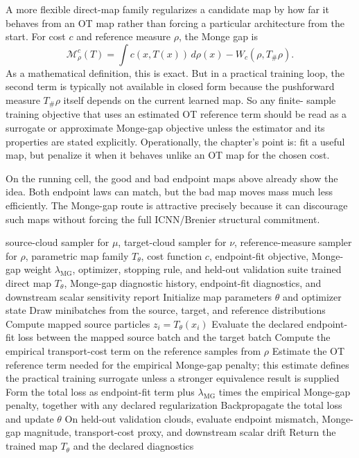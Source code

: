 A more flexible direct-map family regularizes a candidate map by how far it
behaves from an OT map rather than forcing a particular architecture from the
start.  For cost \(c\) and reference measure \(\rho\), the Monge gap is
\begin{equation}
\label{eq:bf-neural-ot-direct-monge-gap}
  \mathcal M_\rho^c(T)
  =
  \int c(x,T(x))\,d\rho(x)-W_c(\rho,T_\#\rho).
\end{equation}
As a mathematical definition, this is exact.  But in a practical training loop,
the second term is typically not available in closed form because the pushforward
measure \(T_\#\rho\) itself depends on the current learned map.  So any finite-
sample training objective that uses an estimated OT reference term should be read
as a surrogate or approximate Monge-gap objective unless the estimator and its
properties are stated explicitly.  Operationally, the chapter’s point is: fit a
useful map, but penalize it when it behaves unlike an OT map for the chosen
cost.

On the running cell, the good and bad endpoint maps above already show the idea.
Both endpoint laws can match, but the bad map moves mass much less efficiently.
The Monge-gap route is attractive precisely because it can discourage such maps
without forcing the full ICNN/Brenier structural commitment.

\begin{algorithm}[ht]
\caption{\texttt{train\_monge\_gap\_regularized\_direct\_map}}
\begin{algorithmic}[1]
\Require source-cloud sampler for \(\mu\), target-cloud sampler for \(\nu\), reference-measure sampler for \(\rho\), parametric map family \(T_\theta\), cost function \(c\), endpoint-fit objective, Monge-gap weight \(\lambda_{\mathrm{MG}}\), optimizer, stopping rule, and held-out validation suite
\Ensure trained direct map \(T_\theta\), Monge-gap diagnostic history, endpoint-fit diagnostics, and downstream scalar sensitivity report
\State Initialize map parameters \(\theta\) and optimizer state
  \State Draw minibatches from the source, target, and reference distributions
  \State Compute mapped source particles \(z_i=T_\theta(x_i)\)
  \State Evaluate the declared endpoint-fit loss between the mapped source batch and the target batch
  \State Compute the empirical transport-cost term on the reference samples from \(\rho\)
  \State Estimate the OT reference term needed for the empirical Monge-gap penalty; this estimate defines the practical training surrogate unless a stronger equivalence result is supplied
  \State Form the total loss as endpoint-fit term plus \(\lambda_{\mathrm{MG}}\) times the empirical Monge-gap penalty, together with any declared regularization
  \State Backpropagate the total loss and update \(\theta\)
\EndWhile
\State On held-out validation clouds, evaluate endpoint mismatch, Monge-gap magnitude, transport-cost proxy, and downstream scalar drift
\State Return the trained map \(T_\theta\) and the declared diagnostics
\end{algorithmic}
\end{algorithm}

